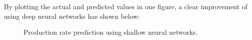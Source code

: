 \documentclass[12pt,a4paper]{report}
\begin{document}
By plotting the actual and predicted values in one figure, a clear improvement of using deep neural networks has shown below:
\begin{figure}[H]
     \begin{center}
%
    \end{center}
    \caption{%
        Production rate prediction using shallow neural networks.
     }%
   \label{fig:subfigures}
\end{figure}
\end{document}
